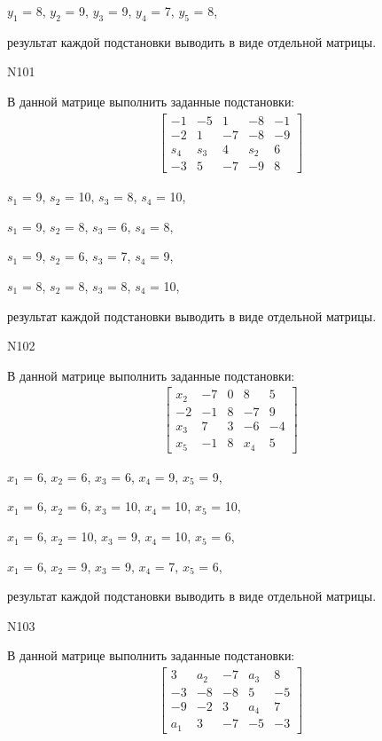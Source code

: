 \documentclass[11pt]{report}
\begin{document}
$y_{1}$ = 8, $y_{2}$ = 9, $y_{3}$ = 9, $y_{4}$ = 7, $y_{5}$ = 8, 

результат каждой подстановки выводить в виде отдельной матрицы.

N101

В данной матрице выполнить заданные подстановки:
\begin{align*}
\left[\begin{matrix}-1 & -5 & 1 & -8 & -1\\-2 & 1 & -7 & -8 & -9\\s_{4} & s_{3} & 4 & s_{2} & 6\\-3 & 5 & -7 & -9 & 8\end{matrix}\right]
\end{align*}


$s_{1}$ = 9, $s_{2}$ = 10, $s_{3}$ = 8, $s_{4}$ = 10, 

$s_{1}$ = 9, $s_{2}$ = 8, $s_{3}$ = 6, $s_{4}$ = 8, 

$s_{1}$ = 9, $s_{2}$ = 6, $s_{3}$ = 7, $s_{4}$ = 9, 

$s_{1}$ = 8, $s_{2}$ = 8, $s_{3}$ = 8, $s_{4}$ = 10, 

результат каждой подстановки выводить в виде отдельной матрицы.

N102

В данной матрице выполнить заданные подстановки:
\begin{align*}
\left[\begin{matrix}x_{2} & -7 & 0 & 8 & 5\\-2 & -1 & 8 & -7 & 9\\x_{3} & 7 & 3 & -6 & -4\\x_{5} & -1 & 8 & x_{4} & 5\end{matrix}\right]
\end{align*}


$x_{1}$ = 6, $x_{2}$ = 6, $x_{3}$ = 6, $x_{4}$ = 9, $x_{5}$ = 9, 

$x_{1}$ = 6, $x_{2}$ = 6, $x_{3}$ = 10, $x_{4}$ = 10, $x_{5}$ = 10, 

$x_{1}$ = 6, $x_{2}$ = 10, $x_{3}$ = 9, $x_{4}$ = 10, $x_{5}$ = 6, 

$x_{1}$ = 6, $x_{2}$ = 9, $x_{3}$ = 9, $x_{4}$ = 7, $x_{5}$ = 6, 

результат каждой подстановки выводить в виде отдельной матрицы.

N103

В данной матрице выполнить заданные подстановки:
\begin{align*}
\left[\begin{matrix}3 & a_{2} & -7 & a_{3} & 8\\-3 & -8 & -8 & 5 & -5\\-9 & -2 & 3 & a_{4} & 7\\a_{1} & 3 & -7 & -5 & -3\end{matrix}\right]
\end{align*}
\end{document}
